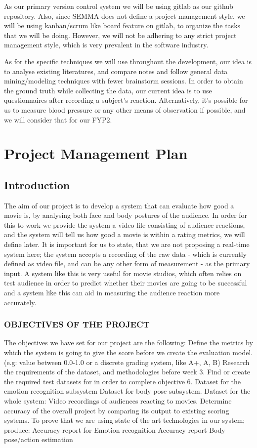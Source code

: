 \documentclass[12pt,a4paper,man]{report}
\begin{document}
As our primary version control system we will be using gitlab as our github repository. Also, since SEMMA does not define a project management style, we will be using kanban/scrum like board feature on gitlab, to organize the tasks that we will be doing. However, we will not be adhering to any strict project management style, which is very prevalent in the software industry.

As for the specific techniques we will use throughout the development, our idea is to analyse existing literatures, and compare notes and follow general data mining/modeling techniques with fewer brainstorm sessions. In order to obtain the ground truth while collecting the data, our current idea is to use questionnaires after recording a subject’s reaction. Alternatively, it’s possible for us to measure blood pressure or any other means of observation if possible, and we will consider that for our FYP2.

\part{Project Management Plan}
\label{sec:org1588cbd}
\chapter{Introduction}
\label{sec:orgd1a6e44}
The aim of our project is to develop a system that can evaluate how good a movie is, by analysing both face and body postures of the audience. In order for this to work we provide the system a video file consisting of audience reactions, and the system will tell us how good a movie is within a rating metrics, we will define later. It is important for us to state, that we are not proposing a real-time system here; the system accepts a recording of the raw data - which is currently defined as video file, and can be any other form of measurement - as the primary input. A system like this is very useful for movie studios, which often relies on test audience in order to predict whether their movies are going to be successful and a system like this can aid in measuring the audience reaction more accurately. 

\section{OBJECTIVES OF THE PROJECT}
\label{sec:org49fc823}
The objectives we have set for our project are the following:
Define the metrics by which the system is going to give the score before we create the evaluation model. (e.g: value between 0.0-1.0 or a discrete grading system, like A+, A, B) 
 Research the requirements of the dataset, and methodologies before week 3.
Find or create the required test datasets for in order to complete objective 6.
Dataset for the emotion recognition subsystem
Dataset for body pose subsystem.
Dataset for the whole system: Video recordings of audiences reacting to movies. 
Determine accuracy of the overall project by comparing its output to existing scoring systems. 
To prove that we are using state of the art technologies in our system; produce:
Accuracy report for Emotion recognition 
Accuracy report Body pose/action estimation
\end{document}
